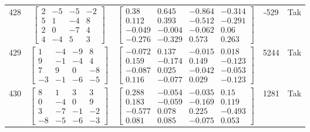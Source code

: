\documentclass[a4paper,12pt]{article}
\begin{document}
\begin{tabular}{c c c c c}
428
&
$\begin{bmatrix} 2 & -5 & -5 & -2 \\ 5 & 1 & -4 & 8 \\ 2 & 0 & -7 & 4 \\ 4 & -4 & 5 & 3 \end{bmatrix}$
&
$\begin{bmatrix} 0.38 & 0.645 & -0.864 & -0.314 \\ 0.112 & 0.393 & -0.512 & -0.291 \\ -0.049 & -0.004 & -0.062 & 0.06 \\ -0.276 & -0.329 & 0.573 & 0.263 \end{bmatrix}$
&
-529
&
Tak
\\
429
&
$\begin{bmatrix} 1 & -4 & -9 & 8 \\ 9 & -1 & -4 & 4 \\ 7 & 9 & 0 & -8 \\ -3 & -1 & -6 & -5 \end{bmatrix}$
&
$\begin{bmatrix} -0.072 & 0.137 & -0.015 & 0.018 \\ 0.159 & -0.174 & 0.149 & -0.123 \\ -0.087 & 0.025 & -0.042 & -0.053 \\ 0.116 & -0.077 & 0.029 & -0.123 \end{bmatrix}$
&
5244
&
Tak
\\
430
&
$\begin{bmatrix} 8 & 1 & 3 & 3 \\ 0 & -4 & 0 & 9 \\ 3 & -7 & -1 & -2 \\ -8 & -5 & -6 & -3 \end{bmatrix}$
&
$\begin{bmatrix} 0.288 & -0.054 & -0.035 & 0.15 \\ 0.183 & -0.059 & -0.169 & 0.119 \\ -0.577 & 0.078 & 0.225 & -0.493 \\ 0.081 & 0.085 & -0.075 & 0.053 \end{bmatrix}$
&
1281
&
Tak
\\
\end{tabular} \egroup \newpage
\end{document}
